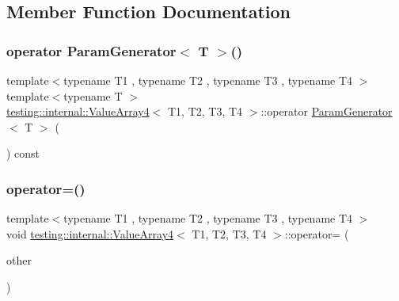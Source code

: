 \subsection{Member Function Documentation}
\mbox{\label{classtesting_1_1internal_1_1_value_array4_aef21f582b20423f5fb8515d9879ad557}} 
\subsubsection{\texorpdfstring{operator ParamGenerator$<$ T $>$()}{operator ParamGenerator< T >()}}
{\footnotesize\ttfamily template$<$typename T1 , typename T2 , typename T3 , typename T4 $>$ \\
template$<$typename T $>$ \\
\mbox{\hyperlink{classtesting_1_1internal_1_1_value_array4}{testing\+::internal\+::\+Value\+Array4}}$<$ T1, T2, T3, T4 $>$\+::operator \mbox{\hyperlink{classtesting_1_1internal_1_1_param_generator}{Param\+Generator}}$<$ T $>$ (\begin{DoxyParamCaption}{ }\end{DoxyParamCaption}) const\hspace{0.3cm}{\ttfamily [inline]}}

\mbox{\label{classtesting_1_1internal_1_1_value_array4_a64e458dff48a9e883a27fd8b14e2dc6a}} 
\subsubsection{\texorpdfstring{operator=()}{operator=()}}
{\footnotesize\ttfamily template$<$typename T1 , typename T2 , typename T3 , typename T4 $>$ \\
void \mbox{\hyperlink{classtesting_1_1internal_1_1_value_array4}{testing\+::internal\+::\+Value\+Array4}}$<$ T1, T2, T3, T4 $>$\+::operator= (\begin{DoxyParamCaption}\item[{const \mbox{\hyperlink{classtesting_1_1internal_1_1_value_array4}{Value\+Array4}}$<$ T1, T2, T3, T4 $>$ \&}]{other }\end{DoxyParamCaption})\hspace{0.3cm}{\ttfamily [private]}}



